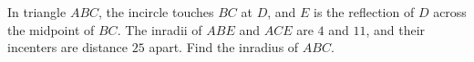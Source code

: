 In triangle $ABC$, the incircle touches $BC$ at $D$, and $E$ is the reflection of $D$ across the midpoint of $BC$. The inradii of $ABE$ and $ACE$ are $4$ and $11$, and their incenters are distance $25$ apart. Find the inradius of $ABC$.
